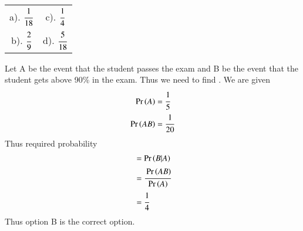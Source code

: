 \begin{table}[h]
\setlength{\tabcolsep}{40pt}
    \begin{tabular}{c c}
         a). $\cfrac{1}{18}$ & c). $\cfrac{1}{4}$ \\
         b). $\cfrac{2}{9}$  & d). $\cfrac{5}{18}$
    \end{tabular}
\end{table}

Let A be the event that the student passes the exam and B be the event that the student gets above 90\% in the exam. Thus we need to find . We are given
\begin{align}
    \Pr\left(A\right)  &= \cfrac{1}{5}\\
    \Pr\left(AB\right) &= \cfrac{1}{20}
\end{align}
Thus required probability 
\begin{align}
    &= \Pr\left(B|A\right)\\
    &= \cfrac{\Pr\left(AB\right)}{\Pr\left(A\right)}\\
    &= \cfrac{1}{4}    
\end{align}
Thus option B is the correct option.